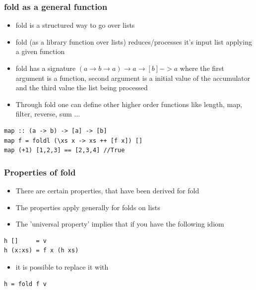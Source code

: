 \documentclass[10pt]{beamer}
\begin{document}
\begin{frame}[fragile]
\frametitle{fold as a general function}
\begin{itemize}
\item fold is a structured way to go over lists  	
\item fold (as a library function over lists) reduces/processes it's input list applying a given function
\item fold has a signature $(a \rightarrow b \rightarrow a) \rightarrow  a \rightarrow  [b] -> a$ where the first argument is a
	function, second argument is a initial value of the accumulator and the third value the list being processed
\item Through fold one can define other higher order functions like length, map, filter, reverse, sum ...
\end{itemize}

\begin{lstlisting}
map :: (a -> b) -> [a] -> [b]
map f = foldl (\xs x -> xs ++ [f x]) [] 
map (+1) [1,2,3] == [2,3,4] //True
\end{lstlisting}

\end{frame}


\begin{frame}[fragile]
\frametitle{Properties of fold}
\begin{itemize}
\item There are certain properties, that have been derived for fold 
\item The properties apply generally for folds on lists 
\item The 'universal property' implies that if you have the following idiom   	
\end{itemize}

\begin{lstlisting}
h []     = v
h (x:xs) = f x (h xs)
\end{lstlisting}

\begin{itemize}
\item it is possible to replace it with
\end{itemize}

\begin{lstlisting}
h = fold f v
\end{lstlisting}

\end{frame}
\end{document}
